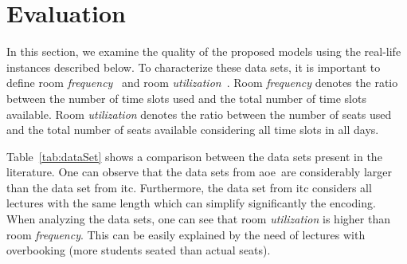 \documentclass[runningheads]{llncs}
\newcommand{\uni}{\gls{aoe}}
\begin{document}



\section{Evaluation}\label{sec:eval}

In this section, we examine the quality of the proposed models using the real-life instances described below. To characterize these data sets, it is important to define room \textit{frequency}~\cite{beyrouthy2009towards} and room \textit{utilization}~\cite{beyrouthy2009towards}. Room \textit{frequency} denotes the ratio between the number of time slots used and the total number of time slots available. Room \textit{utilization} denotes the ratio between the number of seats used and the total number of seats available considering all time slots in all days.


Table~\ref{tab:dataSet} shows a comparison between the data sets present in the literature. One can observe that the data sets from \uni \ are considerably larger than the data set from \gls{itc}. Furthermore, the data set from \gls{itc} considers all lectures with the same length which can simplify significantly the encoding. When analyzing the data sets, one can see that room \textit{utilization} is higher than room \textit{frequency}. This can be easily explained by the need of lectures with overbooking (more students seated than actual seats). %
\end{document}
